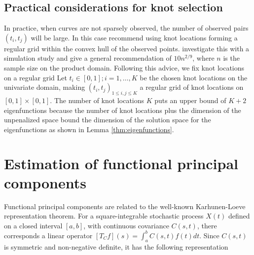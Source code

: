 \subsection{Practical considerations for knot selection} %
\label{sub:practical_considerations_for_knot_selection}

In practice, when curves are not sparsely observed, the number of observed pairs $(t_i, t_j)$ will be large. In this case \cite{CFZ} recommend using knot locations forming a regular grid within the convex hull of the observed points. \cite{Kim:2004tt} investigate this with a simulation study and give a general recommendation of $10n^{2/9}$, where $n$ is the sample size on the product domain. Following this advice, we fix knot locations on a regular grid Let $t_i \in [0,1]; i=1,\dots, K$ be the chosen knot locations on the univariate domain, making $(t_i,t_j)_{1\leq i,j \leq K}$ a regular grid of knot locations on $[0,1]\times[0,1]$. The number of knot locations $K$ puts an upper bound of $K+2$ eigenfunctions because the number of knot locations plus the dimension of the unpenalized space bound the dimension of the solution space for the eigenfunctions as shown in Lemma \ref{thm:eigenfunctions}.

\section{Estimation of functional principal components} 

\label{sec:estimation_of_functional_principal_components}

Functional principal components are related to the well-known Karhunen-Loeve representation theorem. For a square-integrable stochastic process $X(t)$ defined on a closed interval $[a,b]$, with continuous covariance $C(s,t)$, there corresponds a linear operator $[T_Cf](s) = \int_a^bC(s,t)f(t)dt$. Since $C(s,t)$ is symmetric and non-negative definite, it has the following representation 


